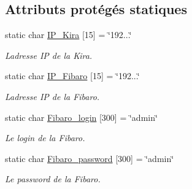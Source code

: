 \subsection*{Attributs protégés statiques}
\begin{DoxyCompactItemize}
\item 
static char \hyperlink{class_e_p_1_1_equipment_a05245b7dd3a4b4e3fb7ab258e6bbe6a2}{I\+P\+\_\+\+Kira} \mbox{[}15\mbox{]} = \char`\"{}192...\char`\"{}\hypertarget{class_e_p_1_1_equipment_a05245b7dd3a4b4e3fb7ab258e6bbe6a2}{}\label{class_e_p_1_1_equipment_a05245b7dd3a4b4e3fb7ab258e6bbe6a2}

\begin{DoxyCompactList}\small\item\em L\textquotesingle{}adresse IP de la Kira. \end{DoxyCompactList}\item 
static char \hyperlink{class_e_p_1_1_equipment_a76405ab4adccec1b32a1c874171749e6}{I\+P\+\_\+\+Fibaro} \mbox{[}15\mbox{]} = \char`\"{}192...\char`\"{}\hypertarget{class_e_p_1_1_equipment_a76405ab4adccec1b32a1c874171749e6}{}\label{class_e_p_1_1_equipment_a76405ab4adccec1b32a1c874171749e6}

\begin{DoxyCompactList}\small\item\em L\textquotesingle{}adresse IP de la Fibaro. \end{DoxyCompactList}\item 
static char \hyperlink{class_e_p_1_1_equipment_a91662c50e9eac8a97c2eb5fcc0f1876c}{Fibaro\+\_\+login} \mbox{[}300\mbox{]} = \char`\"{}admin\char`\"{}\hypertarget{class_e_p_1_1_equipment_a91662c50e9eac8a97c2eb5fcc0f1876c}{}\label{class_e_p_1_1_equipment_a91662c50e9eac8a97c2eb5fcc0f1876c}

\begin{DoxyCompactList}\small\item\em Le login de la Fibaro. \end{DoxyCompactList}\item 
static char \hyperlink{class_e_p_1_1_equipment_ad59ffc7e13909e5586601a1e9ce4f9ee}{Fibaro\+\_\+password} \mbox{[}300\mbox{]} = \char`\"{}admin\char`\"{}\hypertarget{class_e_p_1_1_equipment_ad59ffc7e13909e5586601a1e9ce4f9ee}{}\label{class_e_p_1_1_equipment_ad59ffc7e13909e5586601a1e9ce4f9ee}

\begin{DoxyCompactList}\small\item\em Le password de la Fibaro. \end{DoxyCompactList}\end{DoxyCompactItemize}



